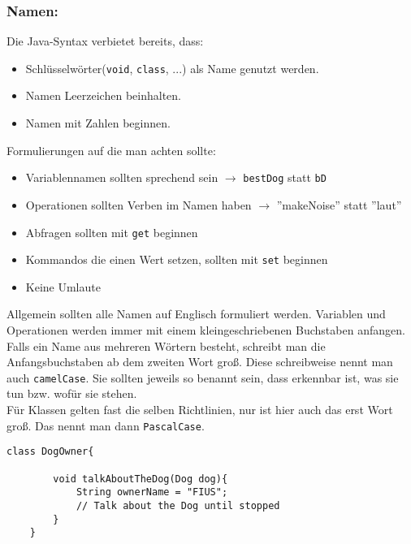 \vspace{5mm}

\subsubsection*{Namen:}

\begin{Infobox}
	Die Java-Syntax verbietet bereits, dass:
	
	\begin{itemize}
		\item Schlüsselwörter(\lstinline{void}, \lstinline{class}, ...) als Name genutzt werden.
		\item Namen Leerzeichen beinhalten.
		\item Namen mit Zahlen beginnen.
	\end{itemize}
\end{Infobox}
\vspace{5mm}
\begin{Infobox}
	Formulierungen auf die man achten sollte:
	\begin{itemize}
		\item Variablennamen sollten sprechend sein $\rightarrow$ \lstinline{bestDog} statt \lstinline{bD}
		\item Operationen sollten Verben im Namen haben $\rightarrow$ ''makeNoise'' statt ''laut''
		\item Abfragen sollten mit \lstinline{get} beginnen
		\item Kommandos die einen Wert setzen, sollten mit \lstinline{set} beginnen
		\item Keine Umlaute
		
	\end{itemize}
\end{Infobox}

\noindent
Allgemein sollten alle Namen auf Englisch formuliert werden.
Variablen und Operationen werden immer mit einem kleingeschriebenen Buchstaben anfangen.
Falls ein Name aus mehreren Wörtern besteht, schreibt man die Anfangsbuchstaben ab dem zweiten Wort groß.
Diese schreibweise nennt man auch \lstinline{camelCase}.
Sie sollten jeweils so benannt sein, dass erkennbar ist, was sie tun bzw. wofür sie stehen.\\
Für Klassen gelten fast die selben Richtlinien, nur ist hier auch das erst Wort groß.
Das nennt man dann \lstinline{PascalCase}.

\begin{lstlisting}[title=\textbf{Beispiel gute Namensgebung}]
	class DogOwner{
		
		void talkAboutTheDog(Dog dog){
			String ownerName = "FIUS";
			// Talk about the Dog until stopped
		}
	}
\end{lstlisting}

